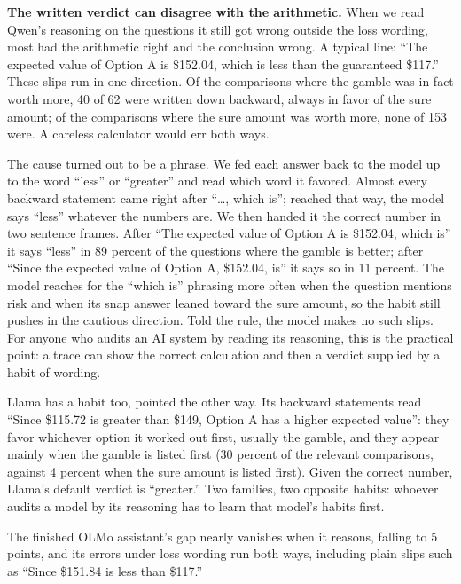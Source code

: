 \documentclass[11pt]{article}
\begin{document}
\textbf{The written verdict can disagree with the arithmetic.} When we read Qwen's reasoning on the
questions it still got wrong outside the loss wording, most had the arithmetic right and the
conclusion wrong. A typical line: ``The expected value of Option A is \$152.04, which is less than the
guaranteed \$117.'' These slips run in one direction. Of the comparisons where the gamble was in fact
worth more, 40 of 62 were written down backward, always in favor of the sure amount; of the comparisons
where the sure amount was worth more, none of 153 were. A careless calculator would err both ways.

The cause turned out to be a phrase. We fed each answer back to the model up to the word ``less'' or
``greater'' and read which word it favored. Almost every backward statement came right after ``\ldots,
which is''; reached that way, the model says ``less'' whatever the numbers are. We then handed it the
correct number in two sentence frames. After ``The expected value of Option A is \$152.04, which is'' it
says ``less'' in 89 percent of the questions where the gamble is better; after ``Since the expected
value of Option A, \$152.04, is'' it says so in 11 percent. The model reaches for the ``which is''
phrasing more often when the question mentions risk and when its snap answer leaned toward the sure
amount, so the habit still pushes in the cautious direction. Told the rule, the model makes no such
slips. For anyone who audits an AI system by reading its reasoning, this is the practical point: a trace
can show the correct calculation and then a verdict supplied by a habit of wording.

Llama has a habit too, pointed the other way. Its backward statements read ``Since \$115.72 is greater
than \$149, Option A has a higher expected value'': they favor whichever option it worked out first,
usually the gamble, and they appear mainly when the gamble is listed first (30 percent of the relevant
comparisons, against 4 percent when the sure amount is listed first). Given the correct number, Llama's
default verdict is ``greater.'' Two families, two opposite habits: whoever audits a model by its
reasoning has to learn that model's habits first.

The finished OLMo assistant's gap nearly vanishes when it
reasons, falling to 5 points, and its errors under loss wording run both ways, including plain slips
such as ``Since \$151.84 is less than \$117.''
\end{document}
